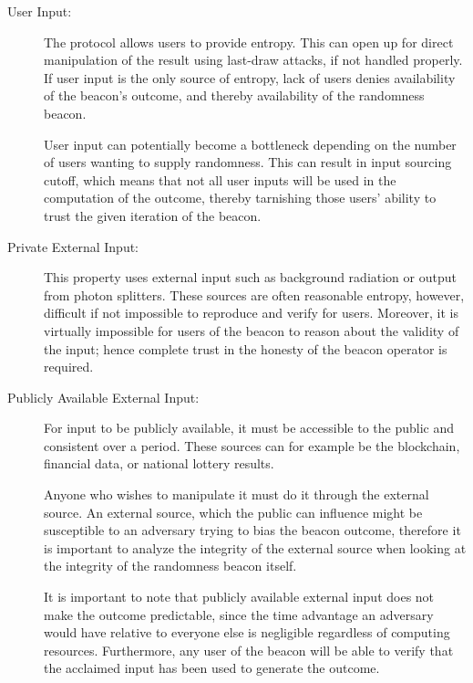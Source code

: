 \begin{description}
    \item[User Input:]
        The protocol allows users to provide entropy.
        This can open up for direct manipulation of the result using last-draw attacks, if not handled properly.
        If user input is the only source of entropy, lack of users denies availability of the beacon's outcome, and thereby availability of the randomness beacon.

        User input can potentially become a bottleneck depending on the number of users wanting to supply randomness.
        This can result in input sourcing cutoff, which means that not all user inputs will be used in the computation of the outcome, thereby tarnishing those users' ability to trust the given iteration of the beacon.

    \item[Private External Input:]
        This property uses external input such as background radiation or output from photon splitters.
        These sources are often reasonable entropy, however, difficult if not impossible to reproduce and verify for users.
        Moreover, it is virtually impossible for users of the beacon to reason about the validity of the input; hence complete trust in the honesty of the beacon operator is required.

    \item[Publicly Available External Input:]
        For input to be publicly available, it must be accessible to the public and consistent over a period.
        These sources can for example be the blockchain, financial data, or national lottery results.

        Anyone who wishes to manipulate it must do it through the external source.
        An external source, which the public can influence might be susceptible to an adversary trying to bias the beacon outcome, therefore it is important to analyze the integrity of the external source when looking at the integrity of the randomness beacon itself.

        It is important to note that publicly available external input does not make the outcome predictable, since the time advantage an adversary would have relative to everyone else is negligible regardless of computing resources.
        Furthermore, any user of the beacon will be able to verify that the acclaimed input has been used to generate the outcome.

\end{description}

